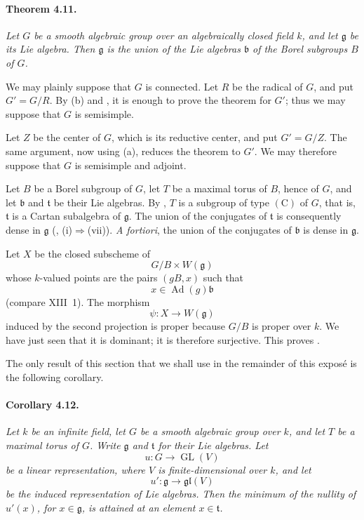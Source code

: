 
\paragraph{\textbf{Theorem 4.11.}}
{\itshape Let \(G\) be a smooth algebraic group over an
algebraically closed field \(k\), and let \(\mathfrak g\) be its
Lie algebra. Then \(\mathfrak g\) is the union of the Lie algebras
\(\mathfrak b\) of the Borel subgroups \(B\) of \(G\).}

We may plainly suppose that \(G\) is connected. Let \(R\) be the
radical of \(G\), and put \(G'=G/R\). By \textup{(b)} and ,
it is enough to prove the theorem for \(G'\); thus we may suppose
that \(G\) is semisimple.

Let \(Z\) be the center of \(G\), which is its reductive center, and
put \(G'=G/Z\). The same argument, now using \textup{(a)},
reduces the theorem to \(G'\). We may therefore suppose that \(G\)
is semisimple and adjoint.

Let \(B\) be a Borel subgroup of \(G\), let \(T\) be a maximal torus
of \(B\), hence of \(G\), and let \(\mathfrak b\) and
\(\mathfrak t\) be their Lie algebras. By , \(T\) is a subgroup
of type \((\mathrm C)\) of \(G\), that is, \(\mathfrak t\) is a
Cartan subalgebra of \(\mathfrak g\). The union of the conjugates
of \(\mathfrak t\) is consequently dense in \(\mathfrak g\)
\textup{(, \textup{(i)}\(\Rightarrow\)\textup{(vii)})}.
\emph{A fortiori}, the union of the conjugates of \(\mathfrak b\)
is dense in \(\mathfrak g\).

Let \(X\) be the closed subscheme of
\[
  G/B\times W(\mathfrak g)
\]
whose \(k\)-valued points are the pairs \((gB,x)\) such that
\[
  x\in\operatorname{Ad}(g)\mathfrak b
\]
\textup{(compare XIII~1)}. The morphism
\[
  \psi\colon X\longrightarrow W(\mathfrak g)
\]
induced by the second projection is proper because \(G/B\) is
proper over \(k\). We have just seen that it is dominant; it is
therefore surjective. This proves .

The only result of this section that we shall use in the remainder
of this exposé is the following corollary.

\paragraph{\textbf{Corollary 4.12.}}
{\itshape Let \(k\) be an infinite field, let \(G\) be a smooth
algebraic group over \(k\), and let \(T\) be a maximal torus of
\(G\). Write \(\mathfrak g\) and \(\mathfrak t\) for their Lie
algebras. Let
\[
  u\colon G\longrightarrow\operatorname{GL}(V)
\]
be a linear representation, where \(V\) is finite-dimensional over
\(k\), and let
\[
  u'\colon\mathfrak g\longrightarrow\mathfrak{gl}(V)
\]
be the induced representation of Lie algebras. Then the minimum of
the nullity of \(u'(x)\), for \(x\in\mathfrak g\), is attained at
an element \(x\in\mathfrak t\).}

